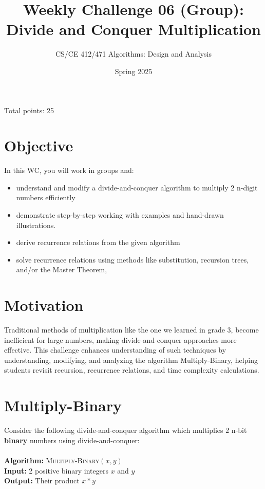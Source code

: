 \documentclass[a4paper]{article}
\title{Weekly Challenge 06 (Group): Divide and Conquer Multiplication}
\author{CS/CE 412/471 Algorithms: Design and Analysis}
\date{Spring 2025}
\begin{document}
\maketitle
\thispagestyle{empty}
\begin{center}
Total points: 25
\end{center}
\section*{Objective}
In this WC, you will work in groups and:
\begin{itemize}
\item understand and modify a divide-and-conquer algorithm to multiply 2 n-digit numbers efficiently 
\item demonstrate step-by-step working with examples and hand-drawn illustrations.
\item derive recurrence relations from the given algorithm 
\item solve recurrence relations using methods like substitution, recursion trees, and/or the Master Theorem,
\end{itemize}

\section*{Motivation}

 Traditional methods of multiplication like the one we learned in grade 3, become inefficient for large numbers, making divide-and-conquer approaches more effective. This challenge enhances understanding of such techniques by understanding, modifying, and analyzing the algorithm Multiply-Binary, helping students revisit recursion, recurrence relations, and time complexity calculations.

\newpage
\section{Multiply-Binary} \label{sec:binary}
Consider the following divide-and-conquer algorithm which multiplies 2 n-bit \textbf{binary} numbers using divide-and-conquer:
\\
\\
\noindent\textbf{Algorithm:} \textsc{Multiply-Binary}$(x, y)$  
\\
\textbf{Input:} 2 positive binary integers $x$ and $y$
\\
\textbf{Output:} Their product $x * y$
\end{document}
